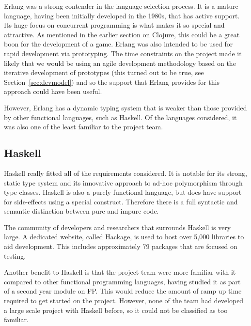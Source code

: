 Erlang was a strong contender in the language selection process. It is a mature language, having been initially developed in the 1980s, that has active support. Its huge focus on concurrent programming is what makes it so special and attractive. As mentioned in the earlier section on Clojure, this could be a great boon for the development of a game. Erlang was also intended to be used for rapid development via prototyping. The time constraints on the project made it likely that we would be using an agile development methodology based on the iterative development of prototypes (this turned out to be true, see Section~\ref{sec:devmodel}) and so the support that Erlang provides for this approach could have been useful.

However, Erlang has a dynamic typing system that is weaker than those provided by other functional languages, such as Haskell. Of the languages considered, it was also one of the least familiar to the project team.

\subsection{Haskell}


Haskell really fitted all of the requirements considered. It is notable for its strong, static type system and its innovative approach to ad-hoc polymorphism through type classes.\cite{wadler1989typeclasses} Haskell is also a purely functional language, but does have support for side-effects using a special construct. Therefore there is a full syntactic and semantic distinction between pure and impure code.

The community of developers and researchers that surrounds Haskell is very large. A dedicated website, called Hackage, is used to host over 5,000 libraries to aid development. This includes approximately 79 packages that are focused on testing.

Another benefit to Haskell is that the project team were more familiar with it compared to other functional programming languages, having studied it as part of a second year module on FP. This would reduce the amount of ramp up time required to get started on the project. However, none of the team had developed a large scale project with Haskell before, so it could not be classified as too familiar.

